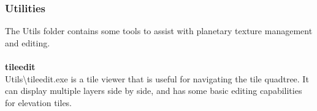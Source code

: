 \documentclass[Orbiter Developer Manual.tex]{subfiles}
\begin{document}
\subsubsection{Utilities}
The Utils folder contains some tools to assist with planetary texture management and editing.\\
\\
\textbf{tileedit}\\
Utils\textbackslash tileedit.exe is a tile viewer that is useful for navigating the tile quadtree. It can display multiple layers side by side, and has some basic editing capabilities for elevation tiles.

\begin{figure}[H]
	\centering
\end{figure}
\end{document}
